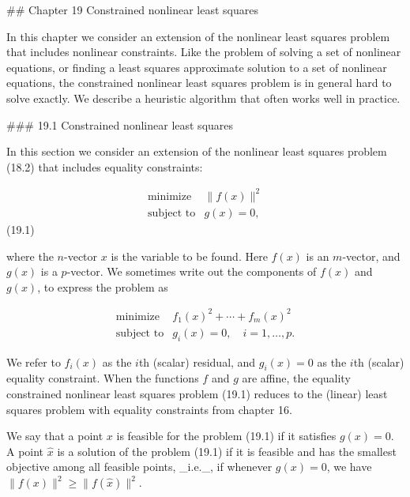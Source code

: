 

## Chapter 19 Constrained nonlinear least squares

In this chapter we consider an extension of the nonlinear least squares problem that includes nonlinear constraints. Like the problem of solving a set of nonlinear equations, or finding a least squares approximate solution to a set of nonlinear equations, the constrained nonlinear least squares problem is in general hard to solve exactly. We describe a heuristic algorithm that often works well in practice.

### 19.1 Constrained nonlinear least squares

In this section we consider an extension of the nonlinear least squares problem (18.2) that includes equality constraints:

\[\begin{array}{ll}\mbox{minimize}&\|f(x)\|^{2}\\ \mbox{subject to}&g(x)=0,\end{array}\] (19.1)

where the \(n\)-vector \(x\) is the variable to be found. Here \(f(x)\) is an \(m\)-vector, and \(g(x)\) is a \(p\)-vector. We sometimes write out the components of \(f(x)\) and \(g(x)\), to express the problem as

\[\begin{array}{ll}\mbox{minimize}&f_{1}(x)^{2}+\cdots+f_{m}(x)^{2}\\ \mbox{subject to}&g_{i}(x)=0,\quad i=1,\ldots,p.\end{array}\]

We refer to \(f_{i}(x)\) as the \(i\)th (scalar) residual, and \(g_{i}(x)=0\) as the \(i\)th (scalar) equality constraint. When the functions \(f\) and \(g\) are affine, the equality constrained nonlinear least squares problem (19.1) reduces to the (linear) least squares problem with equality constraints from chapter 16.

We say that a point \(x\) is feasible for the problem (19.1) if it satisfies \(g(x)=0\). A point \(\hat{x}\) is a solution of the problem (19.1) if it is feasible and has the smallest objective among all feasible points, _i.e._, if whenever \(g(x)=0\), we have \(\|f(x)\|^{2}\geq\|f(\hat{x})\|^{2}\).

